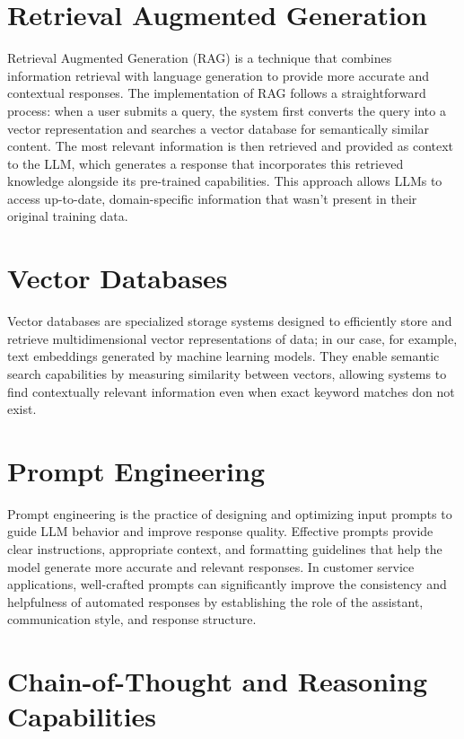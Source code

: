 \section{Retrieval Augmented Generation}
\label{sec:rag}

Retrieval Augmented Generation (RAG) is a technique that combines information retrieval with language generation to provide more accurate and contextual responses.
The implementation of RAG follows a straightforward process: when a user submits a query, the system first converts the query into a vector representation and searches a vector database for semantically similar content.
The most relevant information is then retrieved and provided as context to the LLM, which generates a response that incorporates this retrieved knowledge alongside its pre-trained capabilities.
This approach allows LLMs to access up-to-date, domain-specific information that wasn't present in their original training data.

\section{Vector Databases}
\label{sec:vecdb}

Vector databases are specialized storage systems designed to efficiently store and retrieve multidimensional vector representations of data; in our case, for example, text embeddings generated by machine learning models.
They enable semantic search capabilities by measuring similarity between vectors, allowing systems to find contextually relevant information even when exact keyword matches don not exist.

\section{Prompt Engineering}
\label{sec:prompt-engineering}

Prompt engineering is the practice of designing and optimizing input prompts to guide LLM behavior and improve response quality.
Effective prompts provide clear instructions, appropriate context, and formatting guidelines that help the model generate more accurate and relevant responses.
In customer service applications, well-crafted prompts can significantly improve the consistency and helpfulness of automated responses by establishing the role of the assistant, communication style, and response structure.

\section{Chain-of-Thought and Reasoning Capabilities}
\label{sec:thinking}

